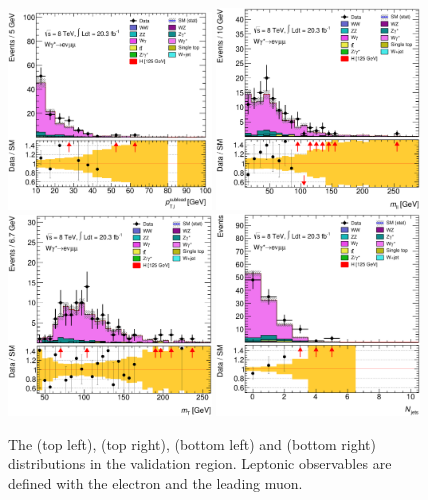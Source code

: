 \begin{figure}[t]
	\includegraphics[width=0.48\textwidth]{tex/backgrounds/Wgstar/em_CutDPhiMax_lepPtSublead_zoom_mh125_lin}
	\hfill
	\includegraphics[width=0.48\textwidth]{tex/backgrounds/Wgstar/em_CutDPhiMax_Mll_mh125_lin}
	\\
	\includegraphics[width=0.48\textwidth]{tex/backgrounds/Wgstar/em_CutDPhiMax_MT_TrackHWW_Clj_mh125_lin}
	\hfill
	\includegraphics[width=0.48\textwidth]{tex/backgrounds/Wgstar/em_CutDPhiMax_m_jet_n_mh125_lin}
	\caption{The \ptsubleadlep (top left), \mll (top right), \mt (bottom left) and \njets 
	(bottom right) distributions in the \Wgstar validation region. Leptonic observables are 
	defined with the electron and the leading muon.}
	\label{fig:wgstar:vr}
\end{figure}

